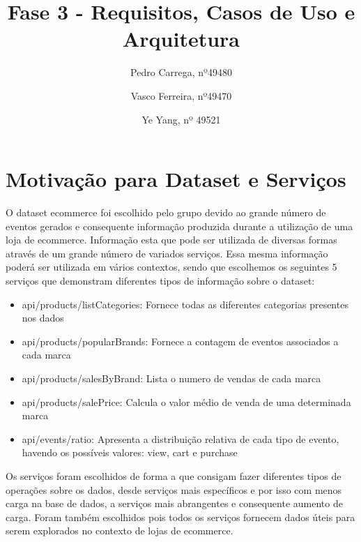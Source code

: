 \documentclass[11pt,a4paper]{article}
\begin{document}
\title{Fase 3 - Requisitos, Casos de Uso e Arquitetura}
\author{Pedro Carrega, nº49480 \and
Vasco Ferreira, nº49470 \and Ye Yang, nº 49521
}


\maketitle

\section{Motivação para Dataset e Serviços}

O dataset ecommerce foi escolhido pelo grupo devido ao grande número de eventos gerados e consequente informação produzida durante a utilização de uma loja de ecommerce. Informação esta que pode ser utilizada de diversas formas através de um grande número de variados serviços. Essa mesma informação poderá ser utilizada em vários contextos, sendo que escolhemos os seguintes 5 serviços que demonstram diferentes tipos de informação sobre o dataset:

\begin{itemize}
  \item api/products/listCategories: Fornece todas as diferentes categorias presentes nos dados
  \item api/products/popularBrands: Fornece a contagem de eventos associados a cada marca
  \item api/products/salesByBrand: Lista o numero de vendas de cada marca
  \item api/products/salePrice: Calcula o valor médio de venda de uma determinada marca
  \item api/events/ratio: Apresenta a distribuição relativa de cada tipo de evento, havendo os possíveis valores: view, cart e purchase
\end{itemize}

Os serviços foram escolhidos de forma a que consigam fazer diferentes tipos de operações sobre os dados, desde serviços mais específicos e por isso com menos carga na base de dados, a serviços mais abrangentes e consequente aumento de carga. Foram também escolhidos pois todos os serviços fornecem dados úteis para serem explorados no contexto de lojas de ecommerce.
\end{document}
